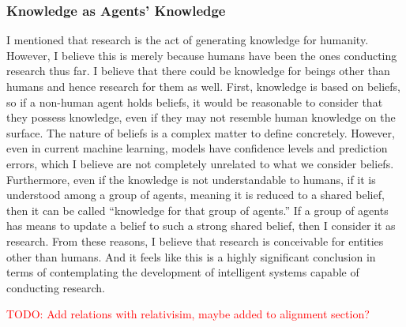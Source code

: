 \documentclass{book}
\begin{document}
\subsubsection{Knowledge as Agents' Knowledge}
I mentioned that research is the act of generating knowledge for humanity. However, I believe this is merely because humans have been the ones conducting research thus far. I believe that there could be knowledge for beings other than humans and hence research for them as well. First, knowledge is based on beliefs, so if a non-human agent holds beliefs, it would be reasonable to consider that they possess knowledge, even if they may not resemble human knowledge on the surface. The nature of beliefs is a complex matter to define concretely. However, even in current machine learning, models have confidence levels and prediction errors, which I believe are not completely unrelated to what we consider beliefs. Furthermore, even if the knowledge is not understandable to humans, if it is understood among a group of agents, meaning it is reduced to a shared belief, then it can be called ``knowledge for that group of agents.'' If a group of agents has means to update a belief to such a strong shared belief, then I consider it as research. From these reasons, I believe that research is conceivable for entities other than humans. And it feels like this is a highly significant conclusion in terms of contemplating the development of intelligent systems capable of conducting research.

\textcolor{red}{TODO: Add relations with relativisim, maybe added to alignment section?}
\end{document}

